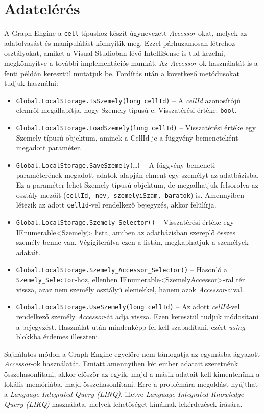 \section{Adatelérés}

A Graph Engine a \texttt{cell} típushoz készít úgynevezett \emph{Accessor}-okat, melyek az adatolvasást és manipulálást könnyítik meg.\cite{GraphEngineAccessors} Ezzel párhuzamosan létrehoz osztályokat, amiket a Visual Studioban lévő IntelliSense is tud kezelni, megkönnyítve a további implementációs munkát. Az \emph{Accessor}-ok használatát is a fenti példán keresztül mutatjuk be. Fordítás után a következő metódusokat tudjuk használni: 
\begin{itemize}
	\item \texttt{Global.LocalStorage.IsSzemely(long cellId)} \--- A \emph{cellId} azonosítójú elemről megállapítja, hogy Szemely típusú-e. Visszatérési értéke: \texttt{bool}.
	\item \texttt{Global.LocalStorage.LoadSzemely(long cellId)} \--- Visszatérési értéke egy Szemely típusú objektum, aminek a CellId-je a függvény bemeneteként megadott paraméter.
	\item \texttt{Global.LocalStorage.SaveSzemely(\ldots{})} \--- A függvény bemeneti paraméterének megadott adatok alapján elment egy személyt az adatbázisba. Ez a paraméter lehet Szemely típusú objektum, de megadhatjuk felsorolva az osztály mezőit (\texttt{cellId, nev, szemelyiSzam, baratok}) is. Amennyiben létezik az adott \texttt{cellId}-vel rendelkező bejegyzés, akkor felülírja.
	\item \texttt{Global.LocalStorage.Szemely\_Selector()} \--- Visszatérési értéke egy IEnumerable<Szemely> lista, amiben az adatbázisban szereplő összes személy benne van. Végigiterálva ezen a listán, megkaphatjuk a személyek adatait.
	\item \texttt{Global.LocalStorage.Szemely\_Accessor\_Selector()} \--- Hasonló a \texttt{Szemely\_Selector}-hoz, ellenben IEnumerable<SzemelyAccessor>-ral tér vissza, azaz nem személy osztályú elemekkel, hanem azok \emph{Accessor}-aival.
	\item \texttt{Global.LocalStorage.UseSzemely(long cellId)} \--- Az adott \emph{cellId}-vel rendelkező személy \emph{Accessor}-át adja vissza. Ezen keresztül tudjuk módosítani a bejegyzést. Használat után mindenképp fel kell szabadítani, ezért \emph{using} blokkba érdemes illeszteni.
\end{itemize}

Sajnálatos módon a Graph Engine egyelőre nem támogatja az egymásba ágyazott \emph{Accessor}-ok használatát. Emiatt amennyiben két ember adatait szeretnénk összehasonlítani, akkor először az egyik, majd a másik adatait kell kimentenünk a lokális memóriába, majd összehasonlítani. Erre a problémára megoldást nyújthat a \emph{Language-Integrated Query (LINQ)}, illetve \emph{Language Integrated Knowledge Query (LIKQ)} használata, melyek lehetőséget kínálnak lekérdezések írására.


